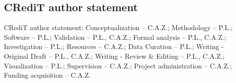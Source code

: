 \documentclass[pdflatex,sn-mathphys-num]{sn-jnl}%
\theoremstyle{thmstyleone}%
\theoremstyle{thmstyletwo}%
\theoremstyle{thmstylethree}%
\begin{document}
\begin{appendices}
\section{CRediT author statement}\label{secA2}%
CRediT author statement: Conceptualization -- C.A.Z.; Methodology -- P.L.; Software -- P.L.; Validation -- P.L., C.A.Z.; Formal analysis -- P.L., C.A.Z.; Investigation -- P.L.; Resources -- C.A.Z.; Data Curation -- P.L.; Writing - Original Draft -- P.L., C.A.Z.; Writing - Review \& Editing -- P.L., C.A.Z.; Visualization -- P.L.; Supervision -- C.A.Z.; Project administration -- C.A.Z.; Funding acquisition -- C.A.Z.

\end{appendices}

\end{document}
